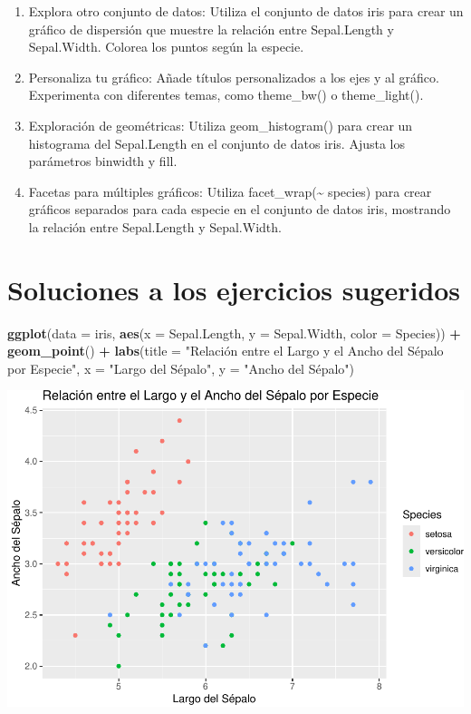\documentclass[
]{book}
\newenvironment{Shaded}{\begin{snugshade}}{\end{snugshade}}
\newcommand{\AttributeTok}[1]{\textcolor[rgb]{0.13,0.29,0.53}{#1}}
\newcommand{\FunctionTok}[1]{\textcolor[rgb]{0.13,0.29,0.53}{\textbf{#1}}}
\newcommand{\NormalTok}[1]{#1}
\newcommand{\SpecialCharTok}[1]{\textcolor[rgb]{0.81,0.36,0.00}{\textbf{#1}}}
\newcommand{\StringTok}[1]{\textcolor[rgb]{0.31,0.60,0.02}{#1}}
\providecommand{\tightlist}{%
  \setlength{\itemsep}{0pt}\setlength{\parskip}{0pt}}
\begin{document}
\begin{enumerate}
\def\labelenumi{\arabic{enumi}.}
\tightlist
\item
  Explora otro conjunto de datos: Utiliza el conjunto de datos iris para crear un gráfico de dispersión que muestre la relación entre Sepal.Length y Sepal.Width. Colorea los puntos según la especie.
\item
  Personaliza tu gráfico: Añade títulos personalizados a los ejes y al gráfico. Experimenta con diferentes temas, como theme\_bw() o theme\_light().
\item
  Exploración de geométricas: Utiliza geom\_histogram() para crear un histograma del Sepal.Length en el conjunto de datos iris. Ajusta los parámetros binwidth y fill.
\item
  Facetas para múltiples gráficos: Utiliza facet\_wrap(\textasciitilde{} species) para crear gráficos separados para cada especie en el conjunto de datos iris, mostrando la relación entre Sepal.Length y Sepal.Width.
\end{enumerate}

\hypertarget{soluciones-a-los-ejercicios-sugeridos}{%
\section{Soluciones a los ejercicios sugeridos}\label{soluciones-a-los-ejercicios-sugeridos}}

\begin{Shaded}
\begin{Highlighting}[]
\FunctionTok{ggplot}\NormalTok{(}\AttributeTok{data =}\NormalTok{ iris, }\FunctionTok{aes}\NormalTok{(}\AttributeTok{x =}\NormalTok{ Sepal.Length, }\AttributeTok{y =}\NormalTok{ Sepal.Width, }\AttributeTok{color =}\NormalTok{ Species)) }\SpecialCharTok{+} 
  \FunctionTok{geom\_point}\NormalTok{() }\SpecialCharTok{+}
  \FunctionTok{labs}\NormalTok{(}\AttributeTok{title =} \StringTok{"Relación entre el Largo y el Ancho del Sépalo por Especie"}\NormalTok{,}
       \AttributeTok{x =} \StringTok{"Largo del Sépalo"}\NormalTok{,}
       \AttributeTok{y =} \StringTok{"Ancho del Sépalo"}\NormalTok{)}
\end{Highlighting}
\end{Shaded}

\includegraphics{bookdown-demo_files/figure-latex/unnamed-chunk-172-1.pdf}
\end{document}
